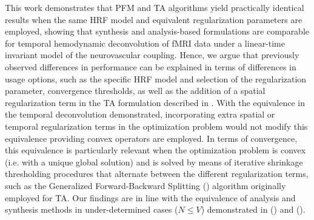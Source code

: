 This work demonstrates that PFM and TA algorithms yield practically identical results when the same HRF model and equivalent regularization parameters are employed, showing that synthesis and analysis-based formulations are comparable for temporal hemodynamic deconvolution of fMRI data under a linear-time invariant model of the neurovascular coupling. Hence, we argue that previously observed differences in performance can be explained in terms of differences in usage options, such as the specific HRF model and selection of the regularization parameter, convergence thresholds, as well as the addition of a spatial regularization term in the TA formulation described in \citealt{Karahanoglu2013TotalactivationfMRI}. With the equivalence in the temporal deconvolution demonstrated, incorporating extra spatial or temporal regularization terms in the optimization problem would not modify this equivalence providing convex operators are employed. In terms of convergence, this equivalence is particularly relevant when the optimization problem is convex (i.e. with a unique global solution) and is solved by means of iterative shrinkage thresholding procedures that alternate between the different regularization terms, such as the Generalized Forward-Backward Splitting (\citealt{Raguet2013GeneralizedForwardBackward}) algorithm originally employed for TA. Our findings are in line with the equivalence of analysis and synthesis methods in under-determined cases (\(N \leq V\)) demonstrated in (\citealt{Elad2007Analysisversussynthesis}) and (\citealt{ortelli2019synthesis}).

